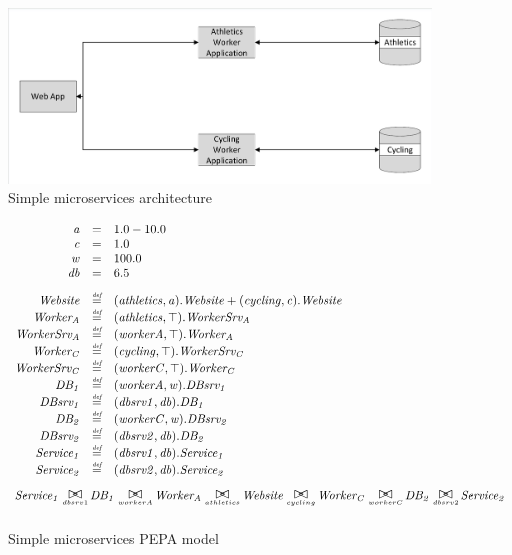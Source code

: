 \begin{figure}
	\label{figure:simplemicro_architecture}
	\centering
	\includegraphics[trim = 5 5 5 5, clip, width=\textwidth]{img/simplemicro}
	\caption{Simple microservices architecture}
\end{figure}

\begin{figure}
	\label{figure:simplemicro}
	\centering
	\begin{displaymath}
		\begin{array}{rcl}
			\mathit{a} & = & 1.0 - 10.0\\
			\mathit{c} & = & 1.0\\
			\mathit{w} & = & 100.0\\
			\mathit{db} & = & 6.5\\
			[2.0ex]		\mathit{Website} & \rmdef & (\mathit{athletics},\mathit{a}).\mathit{Website}+(\mathit{cycling},\mathit{c}).\mathit{Website}\\
			\mathit{Worker_A} & \rmdef & (\mathit{athletics},\top).\mathit{WorkerSrv_A}\\
			\mathit{WorkerSrv_A} & \rmdef & (\mathit{workerA},\top).\mathit{Worker_A}\\
			\mathit{Worker_C} & \rmdef & (\mathit{cycling},\top).\mathit{WorkerSrv_C}\\
			\mathit{WorkerSrv_C} & \rmdef & (\mathit{workerC},\top).\mathit{Worker_C}\\
			\mathit{DB_1} & \rmdef & (\mathit{workerA},\mathit{w}).\mathit{DBsrv_1}\\
			\mathit{DBsrv_1} & \rmdef & (\mathit{dbsrv1},\mathit{db}).\mathit{DB_1}\\
			\mathit{DB_2} & \rmdef & (\mathit{workerC},\mathit{w}).\mathit{DBsrv_2}\\
			\mathit{DBsrv_2} & \rmdef & (\mathit{dbsrv2},\mathit{db}).\mathit{DB_2}\\
			\mathit{Service_1} & \rmdef & (\mathit{dbsrv1},\mathit{db}).\mathit{Service_1}\\
			\mathit{Service_2} & \rmdef & (\mathit{dbsrv2},\mathit{db}).\mathit{Service_2}\\
			[2.0ex]		\multicolumn{3}{l}{\mathit{Service_1}\sync{dbsrv1}\mathit{DB_1}\sync{workerA}\mathit{Worker_A}\sync{athletics}\mathit{Website}\sync{cycling}\mathit{Worker_C}\sync{workerC}\mathit{DB_2}\sync{dbsrv2}\mathit{Service_2}}\\
			[2.0ex]	\end{array}
	\end{displaymath}
	\caption{Simple microservices PEPA model}
\end{figure}

